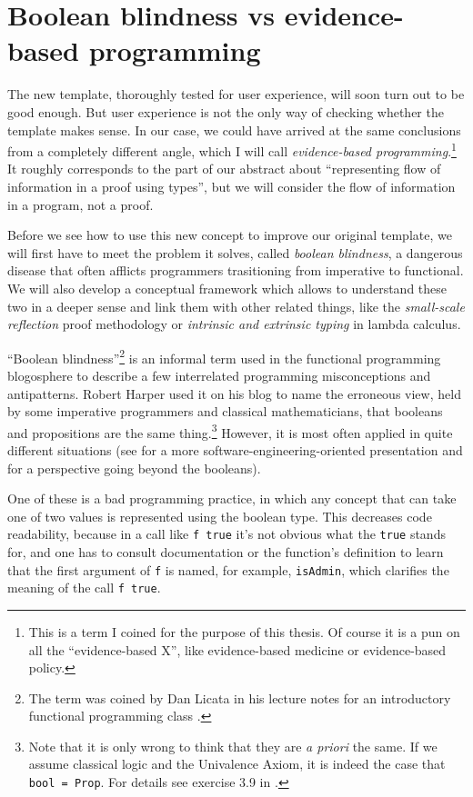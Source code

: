 \documentclass[declaration,mgr,english,shortabstract]{iithesis}
\newcommand{\m}[1]{\texttt{#1}}
\begin{document}
\section{Boolean blindness vs evidence-based programming}

The new template, thoroughly tested for user experience, will soon turn out to be good enough. But user experience is not the only way of checking whether the template makes sense. In our case, we could have arrived at the same conclusions from a completely different angle, which I will call \textit{evidence-based programming}.\footnote{This is a term I coined for the purpose of this thesis. Of course it is a pun on all the ``evidence-based X'', like evidence-based medicine or evidence-based policy.} It roughly corresponds to the part of our abstract about ``representing flow of information in a proof using types'', but we will consider the flow of information in a program, not a proof.

Before we see how to use this new concept to improve our original template, we will first have to meet the problem it solves, called \textit{boolean blindness}, a dangerous disease that often afflicts programmers trasitioning from imperative to functional. We will also develop a conceptual framework which allows to understand these two in a deeper sense and link them with other related things, like the \textit{small-scale reflection} proof methodology or \textit{intrinsic and extrinsic typing} in lambda calculus.

``Boolean blindness''\footnote{The term was coined by Dan Licata in his lecture notes for an introductory functional programming class \cite{BBLicata}.} is an informal term used in the functional programming blogosphere to describe a few interrelated programming misconceptions and antipatterns. Robert Harper used it on his blog \cite{BBHarper} to name the erroneous view, held by some imperative programmers and classical mathematicians, that booleans and propositions are the same thing.\footnote{Note that it is only wrong to think that they are \textit{a priori} the same. If we assume classical logic and the Univalence Axiom, it is indeed the case that \m{bool = Prop}. For details see exercise 3.9 in \cite{HoTTBook}.} However, it is most often applied in quite different situations (see \cite{BBFairbank} for a more software-engineering-oriented presentation and \cite{BBHXA} for a perspective going beyond the booleans).

One of these is a bad programming practice, in which any concept that can take one of two values is represented using the boolean type. This decreases code readability, because in a call like \m{f\ true} it's not obvious what the \m{true} stands for, and one has to consult documentation or the function's definition to learn that the first argument of \m{f} is named, for example, \m{isAdmin}, which clarifies the meaning of the call \m{f true}.
\end{document}
